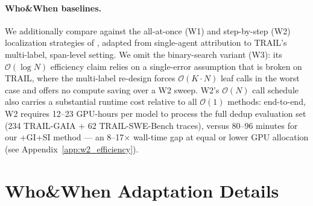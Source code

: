 %
%
%



\paragraph{Who\&When baselines.}
We additionally compare against the all-at-once (\textsc{W1}) and
step-by-step (\textsc{W2}) localization strategies of
\citet{yin2025whoandwhen}, adapted from single-agent attribution to
TRAIL's multi-label, span-level setting. We omit the binary-search
variant (\textsc{W3}): its $\mathcal{O}(\log N)$ efficiency claim
relies on a single-error assumption that is broken on TRAIL, where
the multi-label re-design forces $\mathcal{O}(K\!\cdot\!N)$ leaf
calls in the worst case and offers no compute saving over a
\textsc{W2} sweep.
\textsc{W2}'s $\mathcal{O}(N)$ call schedule also carries a
substantial runtime cost relative to all $\mathcal{O}(1)$ methods:
end-to-end, \textsc{W2} requires 12–23 GPU-hours per model to
process the full dedup evaluation set (234 TRAIL-GAIA +
62 TRAIL-SWE-Bench traces), versus 80–96 minutes for our
\textsc{+GI+SI} method — an 8–17$\times$ wall-time gap at equal or
lower GPU allocation (see Appendix~\ref{app:w2_efficiency}).



\section{Who\&When Adaptation Details}
\label{app:whoandwhen_trail}

